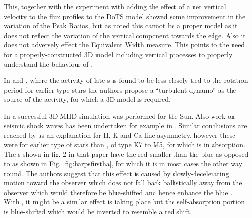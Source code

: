 This, together with the experiment with adding the effect of a net vertical velocity to the flux profiles to the DoTS
model showed some improvement in the variation of the Peak Ratios, but as noted this cannot be a proper model as it does
not reflect the variation of the vertical component towards the edge. Also it does not adversely effect the Equivalent
Width measure. This points to the need for a properly-constructed 3D model including vertical processes to properly
understand the behaviour of \prox.

In \citet{mohanty02} and \citet{mohanty03}, where the activity of late \rdwarf s is found to be less closely tied to the
rotation period for earlier type stars the authors propose a ``turbulent dynamo'' as the source of the activity, for
which a 3D model is required.


In \citet{leenaarts12} a successful 3D MHD simulation was performed for the Sun. Also work on seismic shock waves has
been undertaken for example in \citet{donea06}. Similar conclusions are reached by \citet{rauscher06} as an explanation
for H, K and Ca line asymmetry, however these were for earlier type of stars than \prox, of type K7 to M5, for which
{\ha} is in absorption. The \horn s shown in fig. 2 in that paper have the red {\horn} smaller than the blue {\horn} as
opposed to {\prox} as shown in Fig. \ref{fig:harpsfirstha}, for which it is in most cases the other way round. The
authors suggest that this effect is caused by slowly-decelerating motion toward the observer which does not fall back
ballistically away from the observer which would therefore be blue-shifted and hence enhance the blue \horn. With \prox,
it might be a similar effect is taking place but the self-absorption portion is blue-shifted which would be inverted to
resemble a red shift.

